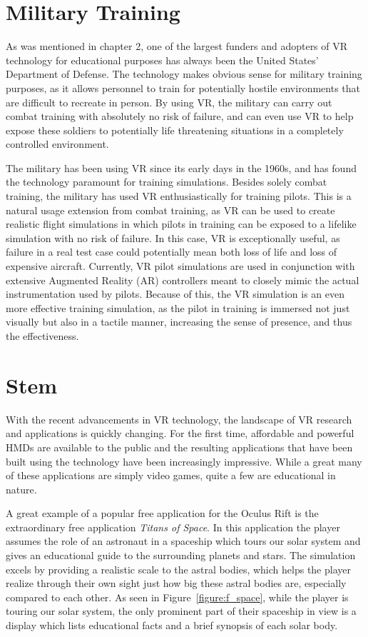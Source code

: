 \section{Military Training}
\label{sec:military}

As was mentioned in chapter 2, one of the largest funders and adopters of VR technology for educational purposes has always been the United States' Department of Defense. The technology makes obvious sense for military training purposes, as it allows personnel to train for potentially hostile environments that are difficult to recreate in person. By using VR, the military can carry out combat training with absolutely no risk of failure, and can even use VR to help expose these soldiers to potentially life threatening situations in a completely controlled environment. 

The military has been using VR since its early days in the 1960s, and has found the technology paramount for training simulations. Besides solely combat training, the military has used VR enthusiastically for training pilots. This is a natural usage extension from combat training, as VR can be used to create realistic flight simulations in which pilots in training can be exposed to a lifelike simulation with no risk of failure. In this case, VR is exceptionally useful, as failure in a real test case could potentially mean both loss of life and loss of expensive aircraft. Currently, VR pilot simulations are used in conjunction with extensive Augmented Reality (AR) controllers meant to closely mimic the actual instrumentation used by pilots. Because of this, the VR simulation is an even more effective training simulation, as the pilot in training is immersed not just visually but also in a tactile manner,  increasing the sense of presence, and thus the effectiveness. 

\section{Stem}
\label{sec:stem}

With the recent advancements in VR technology, the landscape of VR research and applications is quickly changing. For the first time, affordable and powerful HMDs are available to the public and the resulting applications that have been built using the technology have been increasingly impressive. While a great many of these applications are simply video games, quite a few are educational in nature. 

A great example of a popular free application for the Oculus Rift is the extraordinary free application \textit{Titans of Space}. In this application the player assumes the role of an astronaut in a spaceship which tours our solar system and gives an educational guide to the surrounding planets and stars. The simulation excels by providing a realistic scale to the astral bodies, which helps the player realize through their own sight just how big these astral bodies are, especially compared to each other. As seen in Figure~\ref{figure:f_space}, while the player is touring our solar system, the only prominent part of their spaceship in view is a display which lists educational facts and a brief synopsis of each solar body. 

